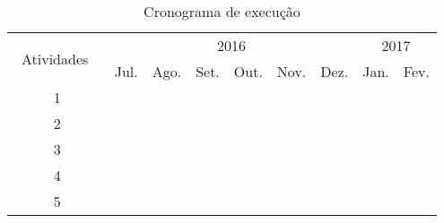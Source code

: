 \begin{table}[htbp]
\centering
\setlength{\tabcolsep}{0pt}
\begin{tabular}{|c|c|c|c|c|c|c|c|c|}
\hline
\multirow{2}{*}{ \ Atividades \ } & \multicolumn{6}{c|}{2016}               & \multicolumn{2}{c|}{2017} \\ \cline{2-9} 
                                  & Jul. & Ago. & Set. & Out. & Nov. & Dez. & Jan. & Fev.       \\ \hline
1                                 & \x   &      &      &      &      &      &      &            \\ \hline
2                                 & \x   & \x   & \x   &      &      &      &      &     				\\ \hline
3                                 &      &      &      & \x   & \x   &      &      &     				\\ \hline
4                                 &      &      &      &      &      & \x   & \x   &     				\\ \hline
5                                 &      &      &      &      &      &      &      & \x  				\\ \hline
\end{tabular}
\caption{Cronograma de execução}
\label{tab:cronograma}
\end{table}